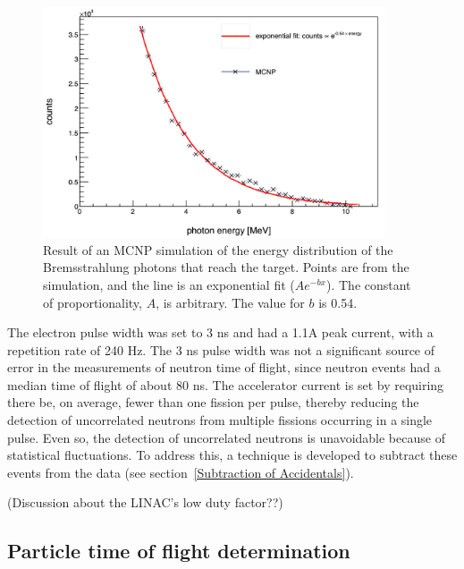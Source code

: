 \begin{figure}[h]
\includegraphics[width=0.9\textwidth]{Content/Methods/MCNPBremDistribution.png}
\caption{Result of an MCNP simulation of the energy distribution of the Bremsstrahlung photons that reach the target. Points are from the simulation, and the line is an exponential fit ($Ae^{-bx}$). The constant of proportionality, $A$, is arbitrary. The value for $b$ is 0.54.}
\label{fig:BremDist}
\end{figure}

The electron pulse width was set to 3 ns and had a 1.1A peak current, with a repetition rate of 240 Hz. The 3 ns pulse width was not a significant source of error in the measurements of neutron time of flight, since neutron events had a median time of flight of about 80 ns. 
The accelerator current is set by requiring there be, on average, fewer than one fission per pulse, thereby reducing the detection of uncorrelated neutrons from multiple fissions occurring in a single pulse. Even so, the detection of uncorrelated neutrons is unavoidable because of statistical fluctuations. To address this, a technique is developed to subtract these events from the data (see section~\ref{Subtraction of Accidentals}).

(Discussion about the LINAC's low duty factor??)

\subsection{Particle time of flight determination}
\label{reconstruction}

